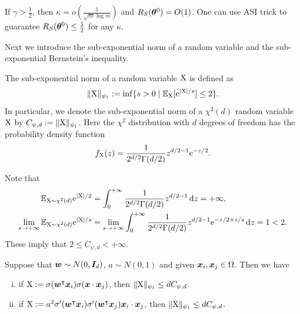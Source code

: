 \documentclass[twoside,11pt]{article}
\begin{document}
\begin{rmk}
    If $\gamma>\frac{1}{2}$, then $\kappa=o(\frac{1}{\sqrt{m}\log m})$ and $R_S(\bm{\theta}^0)=O(1)$. One can use ASI trick \cite{zhang_type_2019} to guarantee $R_S(\bm{\theta}^0)\leq\frac{1}{2}$ for any $\kappa$.
\end{rmk}
Next we introduce the sub-exponential norm of a random variable and the sub-exponential Bernstein's inequality.
\begin{defi}
    The sub-exponential norm of a random variable $\textnormal{X}$ is defined as
    \begin{equation}
        \lVert\textnormal{X}\rVert_{\psi_1} := \inf\{s>0 \mid \mathbb{E}_{\textnormal{X}}[\mathrm{e}^{\lvert\textnormal{X}\rvert/s}]\leq 2\}.
    \end{equation}
    In particular, we denote the sub-exponential norm of a $\chi^2(d)$ random variable $\textnormal{X}$ by $C_{\psi,d}:=\lVert\textnormal{X}\rVert_{\psi_1}$. Here the $\chi^2$ distribution with $d$ degrees of freedom has the probability density function
    \begin{equation*}
        f_{\textnormal{X}}(z)=\frac{1}{2^{d/2}\Gamma(d/2)}z^{d/2-1}\mathrm{e}^{-z/2}.
    \end{equation*}
\end{defi}
\begin{rmk}
    Note that
    \begin{align*}
        \mathbb{E}_{\textnormal{X}\sim\chi^2(d)}\mathrm{e}^{\lvert\textnormal{X}\rvert/2}
         & =\int_0^{+\infty}\frac{1}{2^{d/2}\Gamma(d/2)}z^{d/2-1}\mathop{}\!\mathrm{d}{z}=+\infty,                            \\
        \lim_{s\to+\infty}\mathbb{E}_{\textnormal{X}\sim\chi^2(d)}\mathrm{e}^{\lvert\textnormal{X}\rvert/s}
         & =\lim_{s\to+\infty}\int_0^{+\infty}\frac{1}{2^{d/2}\Gamma(d/2)}z^{d/2-1}\mathrm{e}^{-z/2+z/s}\mathop{}\!\mathrm{d}{z}=1<2.
    \end{align*}
    These imply that $2\leq C_{\psi,d}<+\infty$.
\end{rmk}
\begin{lem}\label{lem..subexponentialnorm}
    Suppose that $\bm{w}\sim N(0,\bm{I}_d)$, $a\sim N(0,1)$ and given $\bm{x}_i,\bm{x}_j \in\Omega$. Then we have
    \begin{enumerate}[(i)]
        \item if $\textnormal{X}:=\sigma(\bm{w}^\intercal\bm{x}_i)\sigma(\bm{x}\cdot\bm{x}_j)$, then $\lVert\textnormal{X}\rVert_{\psi_1}\leq dC_{\psi,d}$.
        \item if $\textnormal{X}:=a^2\sigma'(\bm{w}^\intercal\bm{x}_i)\sigma'(\bm{w}^\intercal\bm{x}_j)\bm{x}_i\cdot\bm{x}_j$, then $\lVert\textnormal{X}\rVert_{\psi_1}\leq dC_{\psi,d}$.
    \end{enumerate}
\end{lem}
\end{document}
